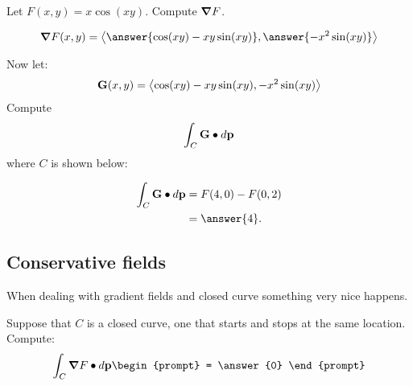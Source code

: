 \documentclass{ximera}
\begin{document}
\begin{question}
  Let $F(x,y) = x\cos(xy)$. Compute $\boldsymbol\nabla F$.
  \begin{prompt}
  \[
  \grad F(x,y) = \vector{\answer{\cos(xy) -xy\sin(xy)},\answer{ -x^2\sin(xy)}}
  \]
  \end{prompt}
  \begin{question}
    Now let:
    \[
    \mathbf{G}(x,y) = \left\langle \cos(xy) -xy\sin(xy), -x^2\sin(xy)\right\rangle
    \]
    Compute
    \[
    \int_C \mathbf G \bullet \mathop{}\!d \mathbf{p}
    \]
    where $C$ is shown below:
    \begin{image}
      \end{image}
      \begin{prompt}
        \begin{align*}
          \int_C \vec{G}\dotp \d \vec{p} &= F(4,0) - F(0,2)\\
          &= \answer{4}.
        \end{align*}
      \end{prompt}
  \end{question}
\end{question}


\subsection{Conservative fields}

When dealing with gradient fields and closed curve something very nice
happens.


\begin{question}
  Suppose that $C$ is a closed curve, one that starts and stops at the
  same location. Compute:
  \[
  \int_C \grad F\dotp \d \vec{p}
  \begin{prompt}
    = \answer{0}
  \end{prompt}
  \]
\end{question}
\end{document}
